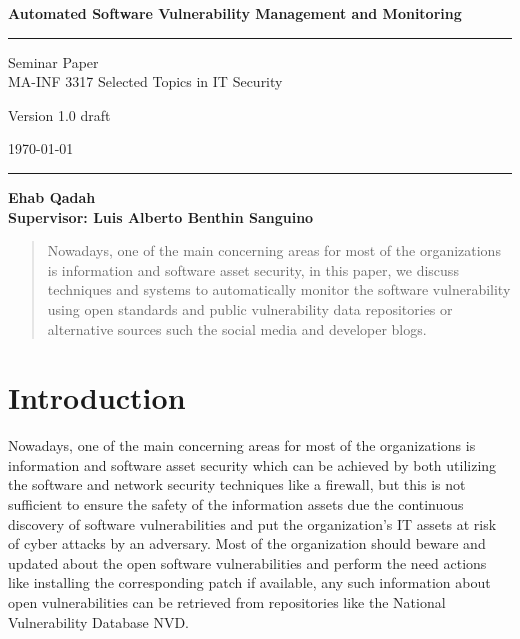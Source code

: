 \documentclass{llncs}
\begin{document}
\begin{flushleft}
 
\centering\LARGE {\bf Automated Software Vulnerability Management and Monitoring }


\rule{\textwidth}{1pt}

\vspace{2pt}


\centering
 Seminar Paper  
 \\MA-INF 3317 Selected Topics in IT Security

{\Large Version 1.0 draft }

\vspace{8pt}
\today

\rule{\textwidth}{1pt}

\vspace{8 cm}

\centering
 \bf Ehab Qadah\\
 
 \vspace{7 pt}
\bf Supervisor: Luis Alberto Benthin Sanguino

\end{flushleft}


\newpage

\tableofcontents

\newpage


\begin{abstract}
Nowadays, one of the main concerning areas for most of the organizations is information and software asset security, in this paper, we discuss techniques and systems to automatically monitor the software vulnerability using open standards and public vulnerability data repositories or alternative sources such the social media and developer blogs. 
\end{abstract}

\section{Introduction}

\par Nowadays, one of the main concerning areas for most of the organizations is information and software asset security which can be achieved by both utilizing the software and network security techniques like a firewall, but this is not sufficient to ensure the safety of the information assets due the continuous discovery of software vulnerabilities and put the organization's IT assets at risk of cyber attacks by an adversary. Most of the organization should beware and updated about the open software vulnerabilities and perform the need actions like installing the corresponding patch if available, any such information about open vulnerabilities can be retrieved from repositories like the National Vulnerability Database NVD.
 
\end{document}

